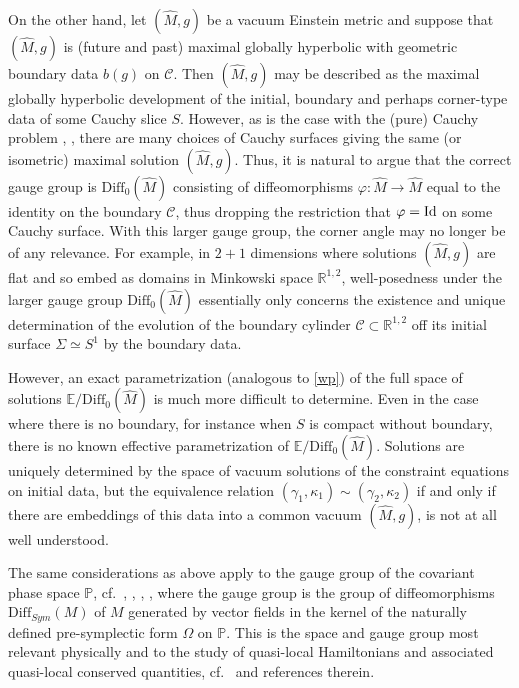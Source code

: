 \documentclass[10pt]{amsart}
\newcommand{\g}{\gamma}
\newcommand{\f}{\varphi}
\newcommand{\Si}{\Sigma}
\renewcommand{\k}{\kappa}
\renewcommand{\O}{\Omega}
\newcommand{\cC}{{\mathcal C}}
\newcommand{\bR}{\mathbb R}
\newcommand{\bE}{\mathbb E}
\newcommand{\bP}{\mathbb P}
\newcommand{\Diff}{\mathrm{Diff}}
\renewcommand{\to}{\rightarrow}
\renewcommand{\hat}{\widehat}
\newcommand{\<}{\langle}
\renewcommand{\>}{\rangle}
\theoremstyle{plain}
\theoremstyle{remark}
\theoremstyle{definition}
\numberwithin{equation}{section}
\begin{document}
  On the other hand, let $(\hat M, g)$ be a vacuum Einstein metric and suppose that $(\hat M, g)$ is (future and past) maximal globally hyperbolic with 
geometric boundary data $b(g)$ on $\cC$. Then $(\hat M, g)$ may be described as the maximal globally hyperbolic development of the initial, boundary 
and perhaps corner-type data of some Cauchy slice $S$. However, as is the case with the (pure) Cauchy problem \cite{C}, \cite{HE}, there are 
many choices of Cauchy surfaces giving the same (or isometric) maximal solution $(\hat M, g)$. Thus, it is natural to argue that the correct gauge 
group is $\Diff_0(\hat M)$ consisting of diffeomorphisms $\f: \hat M \to \hat M$ equal to the identity on the boundary $\cC$, thus dropping the restriction 
that $\f = {\rm  Id}$ on some Cauchy surface. With this larger gauge group, the corner angle may no longer be of any relevance. For example, in 
$2+1$ dimensions where solutions $(\hat M, g)$ are flat and so embed as domains in Minkowski space $\bR^{1,2}$, well-posedness under the larger 
gauge group $\Diff_0(\hat M)$ essentially only concerns the existence and unique determination of the evolution of the boundary cylinder 
$\cC \subset \bR^{1,2}$ off its initial surface $\Si \simeq S^1$ by the boundary data.

  However, an exact parametrization (analogous to \eqref{wp}) of the full space of solutions $\bE/\Diff_0(\hat M)$ is much more difficult to determine. 
Even in the case where there is no boundary, for instance when $S$ is compact without boundary, there is no known effective parametrization 
of $\bE/\Diff_0(\hat M)$. Solutions are uniquely determined by the space of vacuum solutions of the constraint equations on initial data, but the 
equivalence relation $(\g_1, \k_1) \sim (\g_2, \k_2)$ if and only if there are embeddings of this data into a common vacuum $(\hat M, g)$, is not at all 
well understood. 

  The same considerations as above apply to the gauge group of the covariant phase space $\bP$, cf.~\cite{HW}, \cite{LW}, \cite{WZ}, \cite{K}, 
where the gauge group is the group of diffeomorphisms $\Diff_{Sym}(M)$ of $M$ generated by vector fields in the kernel of the naturally defined 
pre-symplectic form $\O$ on $\bP$. This is the space and gauge group most relevant physically and to the study of quasi-local 
Hamiltonians and associated quasi-local conserved quantities, cf.~\cite{Sz} and references therein.  

\medskip 
\end{document}
